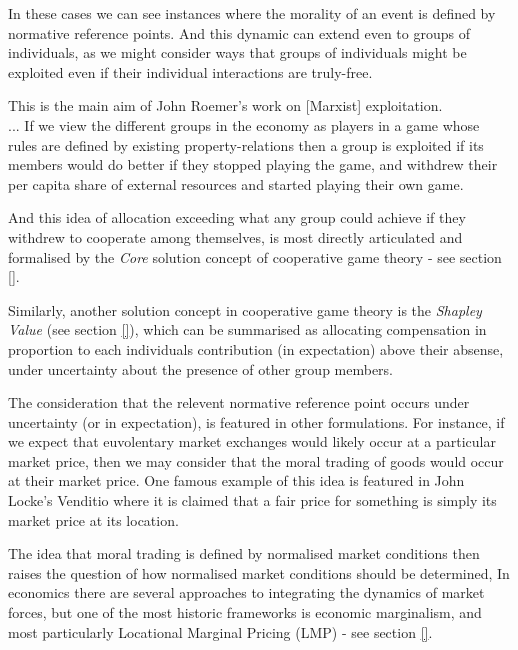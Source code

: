 In these cases we can see instances where the morality of an event is defined by normative reference points. And this dynamic can extend even to groups of individuals, as we might consider ways that groups of individuals might be exploited even if their individual interactions are truly-free.
\begin{displayquote}
This is the main aim of John Roemer's work on [Marxist] exploitation.\\... %
If we view the different groups in the economy as players in a game whose rules are defined by existing property-relations then a group is exploited if its members would do better if they stopped playing the game, and withdrew their per capita share of external resources and started playing their own game.\cite{kymlicka2002contemporary}
\end{displayquote}
And this idea of allocation exceeding what any group could achieve if they withdrew to cooperate among themselves, is most directly articulated and formalised by the \textit{Core} solution concept of cooperative game theory - see section \ref{}.

Similarly, another solution concept in cooperative game theory is the \textit{Shapley Value} (see section \ref{}), which can be summarised as allocating compensation in proportion to each individuals contribution (in expectation) above their absense, under uncertainty about the presence of other group members.

The consideration that the relevent normative reference point occurs under uncertainty (or in expectation), is featured in other formulations.
For instance, if we expect that euvolentary market exchanges would likely occur at a particular market price, then we may consider that the moral trading of goods would occur at their market price.
One famous example of this idea is featured in John Locke's Venditio \cite{locke2003locke} where it is claimed that a fair price for something is simply its market price at its location.

The idea that moral trading is defined by normalised market conditions then raises the question of how normalised market conditions should be determined,
In economics there are several approaches to integrating the dynamics of market forces, but one of the most historic frameworks is economic marginalism, and most particularly Locational Marginal Pricing (LMP) - see section \ref{}.\\

